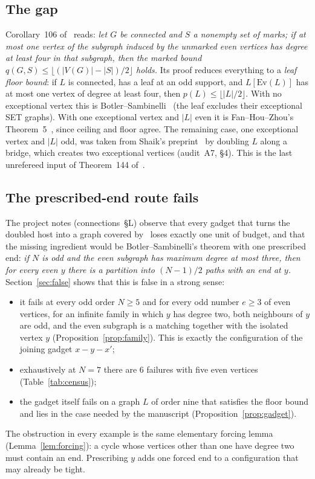 \documentclass[11pt]{amsart}
\theoremstyle{definition}
\newcommand{\Ev}{\mathrm{Ev}}
\begin{document}
\subsection*{The gap}
Corollary~106 of~\cite{MR} reads: \emph{let $G$ be connected and $S$ a nonempty set of marks; if at
most one vertex of the subgraph induced by the unmarked even vertices has degree at least four in
that subgraph, then the marked bound $q(G,S)\le\lfloor(|V(G)|-|S|)/2\rfloor$ holds.} Its proof
reduces everything to a \emph{leaf floor bound}: if $L$ is connected, has a leaf at an odd support,
and $L[\Ev(L)]$ has at most one vertex of degree at least four, then $p(L)\le\lfloor|L|/2\rfloor$.
With no exceptional vertex this is Botler--Sambinelli~\cite[Theorem~13]{BS} (the leaf excludes their
exceptional SET graphs). With one exceptional vertex and $|L|$ even it is Fan--Hou--Zhou's
Theorem~5~\cite{FHZ}, since ceiling and floor agree. The remaining case, one exceptional vertex and
$|L|$ odd, was taken from Shaik's preprint~\cite{Shaik} by doubling $L$ along a bridge, which creates
two exceptional vertices (audit~A7, \S4). This is the last unrefereed input of Theorem~144 of~\cite{MR}.

\subsection*{The prescribed-end route fails}
The project notes (connections~\S L) observe that every gadget that turns the doubled host into a
graph covered by~\cite{BS} loses exactly one unit of budget, and that the missing ingredient would
be Botler--Sambinelli's theorem with one prescribed end: \emph{if $N$ is odd and the even subgraph
has maximum degree at most three, then for every even $y$ there is a partition into $(N-1)/2$ paths
with an end at $y$.} Section~\ref{sec:false} shows that this is false in a strong sense:
\begin{itemize}
\item it fails at every odd order $N\ge5$ and for every odd number $e\ge3$ of even vertices, for an
infinite family in which $y$ has degree two, both neighbours of $y$ are odd, and the even subgraph
is a matching together with the isolated vertex $y$ (Proposition~\ref{prop:family}). This is
exactly the configuration of the joining gadget $x-y-x'$;
\item exhaustively at $N=7$ there are $6$ failures with five even vertices
(Table~\ref{tab:census});
\item the gadget itself fails on a graph $L$ of order nine that satisfies the floor bound and lies
in the case needed by the manuscript (Proposition~\ref{prop:gadget}).
\end{itemize}
The obstruction in every example is the same elementary forcing lemma (Lemma~\ref{lem:forcing}):
a cycle whose vertices other than one have degree two must contain an end. Prescribing $y$ adds
one forced end to a configuration that may already be tight.
\end{document}
